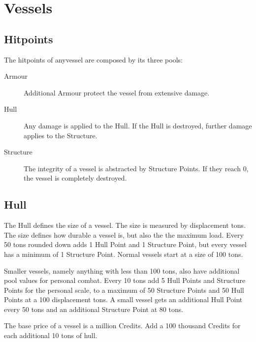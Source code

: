 \chapter{Vessels}
\label{chap:Vessels}

\section{Hitpoints}
\label{sec:Hitpoints}

The hitpoints of anyvessel are composed by its three pools:
\begin{description}
  \item[Armour] Additional Armour protect the vessel from extensive damage.
  \item[Hull] Any damage is applied to the Hull. If the Hull is destroyed, further damage applies to the Structure.
  \item[Structure] The integrity of a vessel is abstracted by Structure Points. If they reach 0, the vessel is completely destroyed.
\end{description}

\section{Hull}
\label{sec:Hull}

The Hull defines the size of a vessel. The size is measured by displacement tons. The size defines how durable a vessel is, but also the the maximum load. Every 50 tons rounded down adds 1 Hull Point and 1 Structure Point, but every vessel has a minimum of 1 Structure Point. Normal vessels start at a size of 100 tons.

Smaller vessels, namely anything with less than 100 tons, also have additional pool values for personal combat. Every 10 tons add 5 Hull Points and Structure Points for the personal scale, to a maximum of 50 Structure Points and 50 Hull Points at a 100 displacement tons.
A small vessel gets an additional Hull Point every 50 tons and an additional Structure Point at 80 tons.

The base price of a vessel is a million Credits. Add a 100 thousand Credits for each additional 10 tons of hull.

